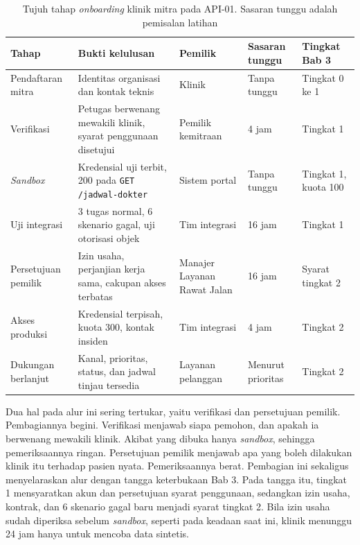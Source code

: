 \begin{table}[!htb]
  \centering
  \caption{Tujuh tahap \textit{onboarding} klinik mitra pada API-01. Sasaran tunggu adalah pemisalan latihan}
  \label{tab:ch11-gerbang}
  \footnotesize
  \begin{tabularx}{\textwidth}{H{1.8cm}GH{2.1cm}H{1.3cm}H{1.5cm}}
    \hline
    \textbf{Tahap} & \textbf{Bukti kelulusan} & \textbf{Pemilik} & \textbf{Sasaran tunggu} & \textbf{Tingkat Bab 3} \\ \hline
    Pendaftaran mitra & Identitas organisasi dan kontak teknis & Klinik & Tanpa tunggu & Tingkat 0 ke 1 \\ \hline
    Verifikasi & Petugas berwenang mewakili klinik, syarat penggunaan disetujui & Pemilik kemitraan & 4 jam & Tingkat 1 \\ \hline
    \textit{Sandbox} & Kredensial uji terbit, 200 pada \texttt{GET /jadwal-dokter} & Sistem portal & Tanpa tunggu & Tingkat 1, kuota 100 \\ \hline
    Uji integrasi & 3 tugas normal, 6 skenario gagal, uji otorisasi objek & Tim integrasi & 16 jam & Tingkat 1 \\ \hline
    Persetujuan pemilik & Izin usaha, perjanjian kerja sama, cakupan akses terbatas & Manajer Layanan Rawat Jalan & 16 jam & Syarat tingkat 2 \\ \hline
    Akses produksi & Kredensial terpisah, kuota 300, kontak insiden & Tim integrasi & 4 jam & Tingkat 2 \\ \hline
    Dukungan berlanjut & Kanal, prioritas, status, dan jadwal tinjau tersedia & Layanan pelanggan & Menurut prioritas & Tingkat 2 \\ \hline
  \end{tabularx}
\end{table}

Dua hal pada alur ini sering tertukar, yaitu verifikasi dan persetujuan pemilik. Pembagiannya begini. Verifikasi menjawab siapa pemohon,
dan apakah ia berwenang mewakili klinik. Akibat yang dibuka hanya \textit{sandbox}, sehingga pemeriksaannya ringan. Persetujuan pemilik
menjawab apa yang boleh dilakukan klinik itu terhadap pasien nyata. Pemeriksaannya berat. Pembagian ini sekaligus menyelaraskan alur dengan
tangga keterbukaan Bab 3. Pada tangga itu, tingkat 1 mensyaratkan akun dan persetujuan syarat penggunaan, sedangkan izin usaha, kontrak, dan 6
skenario gagal baru menjadi syarat tingkat 2. Bila izin usaha sudah diperiksa sebelum \textit{sandbox}, seperti pada keadaan saat ini,
klinik menunggu 24 jam hanya untuk mencoba data sintetis.

